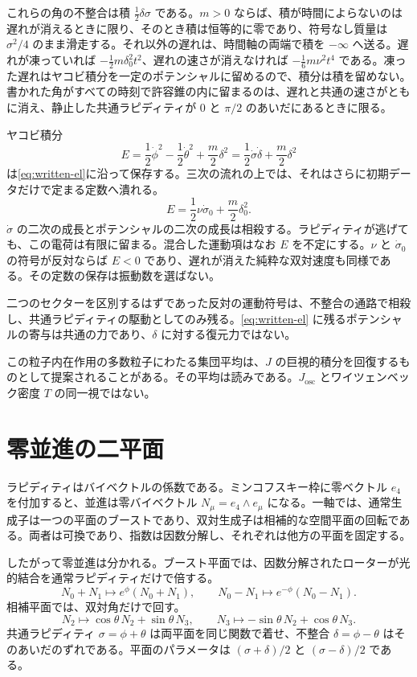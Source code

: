\documentclass[a4paper]{article}
\begin{document}
これらの角の不整合は積 \(\tfrac12\delta\sigma\) である。\(m>0\) ならば、積が時間によらないのは遅れが消えるときに限り、そのとき積は恒等的に零であり、符号なし質量は \(\sigma^2/4\) のまま滑走する。それ以外の遅れは、時間軸の両端で積を \(-\infty\) へ送る。遅れが凍っていれば \(-\tfrac12 m\delta_0^2 t^2\)、遅れの速さが消えなければ \(-\tfrac16 m\nu^2 t^4\) である。凍った遅れはヤコビ積分を一定のポテンシャルに留めるので、積分は積を留めない。書かれた角がすべての時刻で許容錐の内に留まるのは、遅れと共通の速さがともに消え、静止した共通ラピディティが \(0\) と \(\pi/2\) のあいだにあるときに限る。

ヤコビ積分
\[
E
  =\frac12\dot\phi^2
  -\frac12\dot\theta^2
  +\frac m2\delta^2
  =\frac12\dot\sigma\dot\delta
  +\frac m2\delta^2
\]
は\eqref{eq:written-el}に沿って保存する。三次の流れの上では、それはさらに初期データだけで定まる定数へ潰れる。
\[
E=\frac12\nu\dot\sigma_0+\frac m2\delta_0^2.
\]
\(\dot\sigma\) の二次の成長とポテンシャルの二次の成長は相殺する。ラピディティが逃げても、この電荷は有限に留まる。混合した運動項はなお \(E\) を不定にする。\(\nu\) と \(\dot\sigma_0\) の符号が反対ならば \(E<0\) であり、遅れが消えた純粋な双対速度も同様である。その定数の保存は振動数を選ばない。

二つのセクターを区別するはずであった反対の運動符号は、不整合の通路で相殺し、共通ラピディティの駆動としてのみ残る。\eqref{eq:written-el} に残るポテンシャルの寄与は共通の力であり、\(\delta\) に対する復元力ではない。

この粒子内在作用の多数粒子にわたる集団平均は、\(J\) の巨視的積分を回復するものとして提案されることがある。その平均は読みである。\(J_{\mathrm{osc}}\) とワイツェンベック密度 \(T\) の同一視ではない。

\section{零並進の二平面}

ラピディティはバイベクトルの係数である。ミンコフスキー枠に零ベクトル \(e_4\) を付加すると、並進は零バイベクトル \(N_\mu=e_4\wedge e_\mu\) になる。一軸では、通常生成子は一つの平面のブーストであり、双対生成子は相補的な空間平面の回転である。両者は可換であり、指数は因数分解し、それぞれは他方の平面を固定する。

したがって零並進は分かれる。ブースト平面では、因数分解されたローターが光的結合を通常ラピディティだけで倍する。
\[
N_0+N_1\mapsto e^{\phi}(N_0+N_1),\qquad
N_0-N_1\mapsto e^{-\phi}(N_0-N_1).
\]
相補平面では、双対角だけで回す。
\[
N_2\mapsto\cos\theta\,N_2+\sin\theta\,N_3,\qquad
N_3\mapsto-\sin\theta\,N_2+\cos\theta\,N_3.
\]
共通ラピディティ \(\sigma=\phi+\theta\) は両平面を同じ関数で着せ、不整合 \(\delta=\phi-\theta\) はそのあいだのずれである。平面のパラメータは \((\sigma+\delta)/2\) と \((\sigma-\delta)/2\) である。
\end{document}
